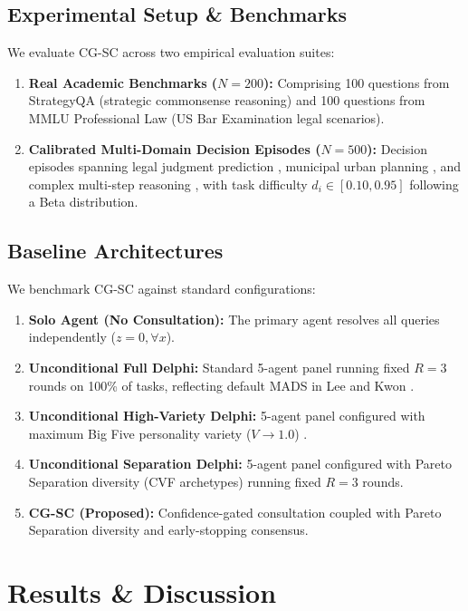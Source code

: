 \documentclass[conference]{IEEEtran}
\begin{document}
\subsection{Experimental Setup \& Benchmarks}
We evaluate CG-SC across two empirical evaluation suites:
\begin{enumerate}
    \item \textbf{Real Academic Benchmarks ($N = 200$):} Comprising 100 questions from StrategyQA (strategic commonsense reasoning) and 100 questions from MMLU Professional Law (US Bar Examination legal scenarios).
    \item \textbf{Calibrated Multi-Domain Decision Episodes ($N = 500$):} Decision episodes spanning legal judgment prediction \cite{jiang2025}, municipal urban planning \cite{kalyuzhnaya2025}, and complex multi-step reasoning \cite{lee2026}, with task difficulty $d_i \in [0.10, 0.95]$ following a Beta distribution.
\end{enumerate}

\subsection{Baseline Architectures}
We benchmark CG-SC against standard configurations:
\begin{enumerate}
    \item \textbf{Solo Agent (No Consultation):} The primary agent resolves all queries independently ($z=0, \forall x$).
    \item \textbf{Unconditional Full Delphi:} Standard 5-agent panel running fixed $R=3$ rounds on 100\% of tasks, reflecting default MADS in Lee and Kwon \cite{lee2026}.
    \item \textbf{Unconditional High-Variety Delphi:} 5-agent panel configured with maximum Big Five personality variety ($V \to 1.0$) \cite{lee2026}.
    \item \textbf{Unconditional Separation Delphi:} 5-agent panel configured with Pareto Separation diversity (CVF archetypes) running fixed $R=3$ rounds.
    \item \textbf{CG-SC (Proposed):} Confidence-gated consultation coupled with Pareto Separation diversity and early-stopping consensus.
\end{enumerate}

\section{Results \& Discussion}
\end{document}
